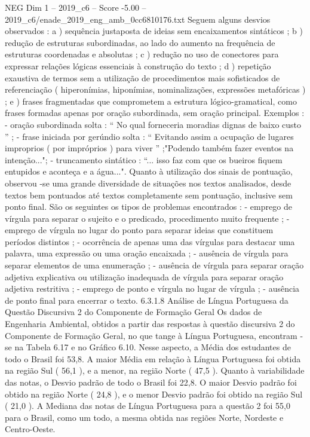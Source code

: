\begin{textsample}{NEG Dim 1 – 2019\_c6 – Score -5.00 – 2019\_c6/enade\_2019\_eng\_amb\_0cc6810176.txt}
Seguem alguns desvios observados : a ) sequência justaposta de ideias sem encaixamentos sintáticos ; b ) redução de estruturas subordinadas, ao lado do aumento na frequência de estruturas coordenadas e absolutas ; c ) redução no uso de conectores para expressar relações lógicas essenciais à construção do texto ; d ) repetição exaustiva de termos sem a utilização de procedimentos mais sofisticados de referenciação ( hiperonímias, hiponímias, nominalizações, expressões metafóricas ) ; e ) frases fragmentadas que comprometem a estrutura lógico-gramatical, como frases formadas apenas por oração subordinada, sem oração principal.
Exemplos : - oração subordinada solta : “ No qual forneceria moradias dignas de baixo custo ” ; - frase iniciada por gerúndio solta : “ Evitando assim a ocupação de lugares improprios ( por impróprios ) para viver ” ;"Podendo também fazer eventos na intenção..."; - truncamento sintático : “... isso faz com que os bueiros fiquem entupidos e aconteça e a água...".
Quanto à utilização dos sinais de pontuação, observou -se uma grande diversidade de situações nos textos analisados, desde textos bem pontuados até textos completamente sem pontuação, inclusive sem ponto final.
São os seguintes os tipos de problemas encontrados : - emprego de vírgula para separar o sujeito e o predicado, procedimento muito frequente ; - emprego de vírgula no lugar do ponto para separar ideias que constituem períodos distintos ; - ocorrência de apenas uma das vírgulas para destacar uma palavra, uma expressão ou uma oração encaixada ; - ausência de vírgula para separar elementos de uma enumeração ; - ausência de vírgula para separar oração adjetiva explicativa ou utilização inadequada de vírgula para separar oração adjetiva restritiva ; - emprego de ponto e vírgula no lugar de vírgula ; - ausência de ponto final para encerrar o texto. 6.3.1.8 Análise de Língua Portuguesa da Questão Discursiva 2 do Componente de Formação Geral Os dados de Engenharia Ambiental, obtidos a partir das respostas à questão discursiva 2 do Componente de Formação Geral, no que tange à Língua Portuguesa, encontram -se na Tabela 6.17 e no Gráfico 6.10.
Nesse aspecto, a Média dos estudantes de todo o Brasil foi 53,8.
A maior Média em relação à Língua Portuguesa foi obtida na região Sul ( 56,1 ), e a menor, na região Norte ( 47,5 ).
Quanto à variabilidade das notas, o Desvio padrão de todo o Brasil foi 22,8.
O maior Desvio padrão foi obtido na região Norte ( 24,8 ), e o menor Desvio padrão foi obtido na região Sul ( 21,0 ).
A Mediana das notas de Língua Portuguesa para a questão 2 foi 55,0 para o Brasil, como um todo, a mesma obtida nas regiões Norte, Nordeste e Centro-Oeste.

\end{textsample}
